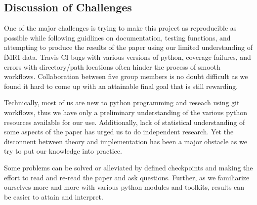 \subsection{Discussion of Challenges}

\par \indent One of the major challenges is trying to make this project as reproducible as possible while following guidlines on documentation, testing functions, and attempting to produce the results of the paper using our limited understanding of fMRI data. Travis CI bugs with various versions of python, coverage failures, and errors with directory/path locations often hinder the process of smooth workflows. Collaboration between five group members is no doubt difficult as we found it hard to come up with an attainable final goal that is still rewarding. 
\par Technically, most of us are new to python programming and reseach using git workflows, thus we have only a preliminary understanding of the various python resources available for our use. Additionally, lack of statistical understanding of some aspects of the paper has urged us to do independent research. Yet the disconnent between theory and implementation has been a major obstacle as we try to put our knowledge into practice. 
\par Some problems can be solved or alleviated by defined checkpoints and making the effort to read and re-read the paper and ask questions. Further, as we familiarize ourselves more and more  with various python modules and toolkits, results can be easier to attain and interpret.
